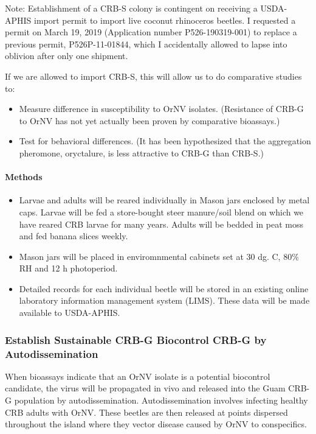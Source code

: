 \documentclass[14pt,english,letterpaper]{scrartcl}
\begin{document}
Note: Establishment of a CRB-S colony is contingent on receiving a USDA-APHIS import permit to import live coconut rhinoceros beetles. I requested a permit on March 19, 2019 (Application number P526-190319-001) to replace a previous permit, P526P-11-01844, which I accidentally allowed to lapse into oblivion after only one shipment.

If we are allowed to import CRB-S, this will allow us to do comparative studies to:
\begin{itemize}
	\item Measure difference in susceptibility to OrNV isolates. (Resistance of CRB-G to OrNV has not yet actually been proven by comparative bioassays.)
	\item Test for behavioral differences. (It has been hypothesized that the aggregation pheromone, oryctalure, is less attractive to CRB-G than CRB-S.)
\end{itemize}

\paragraph{Methods}

\begin{itemize}
	\item Larvae and adults will be reared individually in Mason jars enclosed by metal caps. Larvae will be fed a store-bought steer manure/soil blend on which we have reared CRB larvae for many years. Adults will be bedded in peat moss and fed banana slices weekly. 
	\item Mason jars will be placed in enviromnmental cabinets set at 30 dg. C, 80\% RH and 12 h photoperiod. 
	\item Detailed records for each individual beetle will be stored in an existing online laboratory information management system (LIMS). These data will be made available to USDA-APHIS.
	
\end{itemize}


\subsubsection{Establish Sustainable CRB-G Biocontrol CRB-G by Autodissemination}

When bioassays indicate that an OrNV isolate is a potential biocontrol candidate, the virus will be
propagated in vivo and released into the Guam CRB-G population by autodissemination. Autodissemination involves infecting healthy CRB adults with OrNV. These beetles are then released at points dispersed throughout the island where they vector disease caused by OrNV to conspecifics. 
\end{document}
